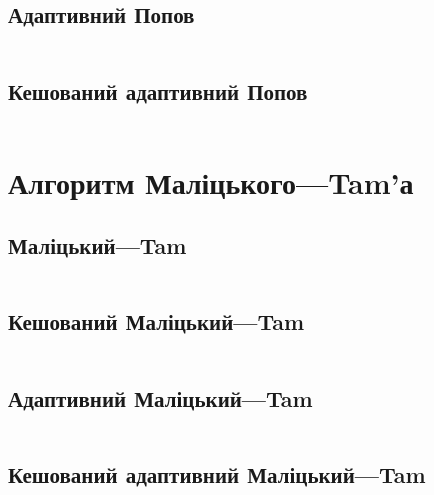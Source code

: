 \newpage
\subsection{Адаптивний Попов}
\inputminted[linenos,firstline=8,lastline=57,fontsize=\tiny]{python}{src/adaptive/popov.py}

\newpage
\subsection{Кешований адаптивний Попов}
\inputminted[linenos,firstline=60,fontsize=\tiny]{python}{src/adaptive/popov.py}

\section{Алгоритм Маліцького---Tam'а}

\subsection{Маліцький---Tam}
\inputminted[linenos,firstline=8,lastline=41,fontsize=\tiny]{python}{src/core/malitskyi_tam.py}

\newpage
\subsection{Кешований Маліцький---Tam}
\inputminted[linenos,firstline=44,fontsize=\tiny]{python}{src/core/malitskyi_tam.py}

\newpage
\subsection{Адаптивний Маліцький---Tam}
\inputminted[linenos,firstline=8,lastline=53,fontsize=\tiny]{python}{src/adaptive/malitskyi_tam.py}

\newpage
\subsection{Кешований адаптивний Маліцький---Tam}
\inputminted[linenos,firstline=56,fontsize=\tiny]{python}{src/adaptive/malitskyi_tam.py}
